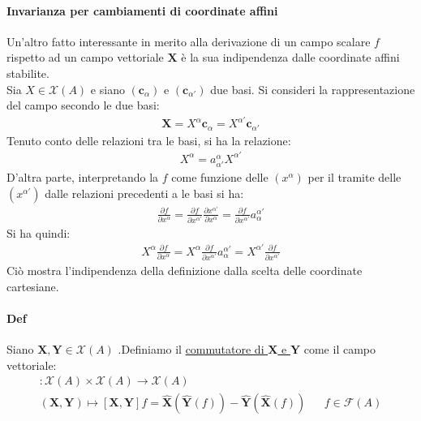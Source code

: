     \paragraph{Invarianza per cambiamenti di coordinate affini} Un'altro fatto interessante in merito alla derivazione di un campo scalare $f$ rispetto ad un campo vettoriale $\mathbf{X}$ è la sua indipendenza dalle coordinate affini stabilite.\\
    Sia $X\in \mathcal{X}(A)$ e siano $(\mathbf{c}_\alpha)$ e $(\mathbf{c}_{\alpha'})$ due basi. Si consideri la rappresentazione del campo secondo le due basi:
    \begin{align*}
        \mathbf{X}=X^\alpha\mathbf{c}_\alpha =X^{\alpha'}\mathbf{c}_{\alpha'}
    \end{align*}
    Tenuto conto delle relazioni tra le basi, si ha la relazione:
    \begin{align*}
        X^\alpha=a^\alpha_{\alpha'}X^{\alpha'}
    \end{align*}
    D'altra parte, interpretando la $f$ come funzione delle $(x^\alpha)$ per il tramite delle $(x^{\alpha'})$ dalle relazioni precedenti a le basi si ha:
    \begin{align*}
        \frac{\partial f}{\partial x^\alpha}=\frac{\partial f}{\partial x^{\alpha'}}\frac{\partial x^{\alpha'} }{\partial x^\alpha}=\frac{\partial f}{\partial x^{\alpha'}}a^{\alpha'}_\alpha
    \end{align*}
    Si ha quindi:
    \begin{align*}
        X^\alpha\frac{\partial f}{\partial x^\alpha}=X^\alpha\frac{\partial f}{\partial x^{\alpha'}}a^{\alpha'}_\alpha= X^{\alpha'}\frac{\partial f}{\partial x^{\alpha'}}
    \end{align*}
    Ciò mostra l'indipendenza della definizione dalla scelta delle coordinate cartesiane.
    \paragraph{Def} Siano $\mathbf{X},\mathbf{Y}\in \mathcal{X}(A)$ .Definiamo il \underline{commutatore di $\mathbf{X}$ e $\mathbf{Y}$} come il campo vettoriale:
    \begin{align*}
    [\cdot,\cdot]\colon \mathcal{X}(A)\times \mathcal{X}(A)\to \mathcal{X}(A)\\
        (\mathbf{X},\mathbf{Y})\mapsto[\mathbf{X},\mathbf{Y}]f=\hat{\mathbf{X}}(\hat{\mathbf{Y}}(f))-\hat{\mathbf{Y}}(\hat{\mathbf{X}}(f)) && f\in \mathcal{F}(A)
    \end{align*}
